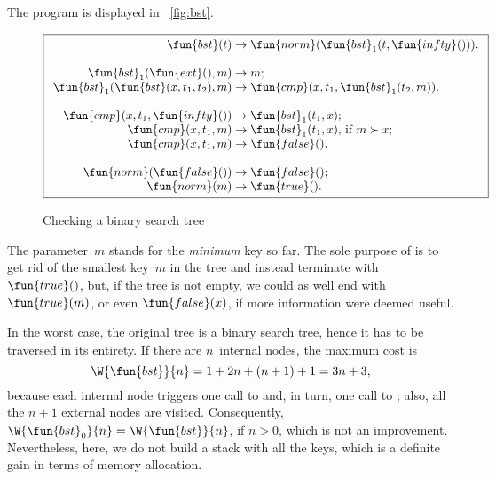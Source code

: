 The program is displayed in
\fig~\vref{fig:bst}.
\begin{figure}[t]
\begin{equation*}
\boxed{
\begin{array}{r@{\;}l@{\;}l}
  \fun{bst}(t) & \rightarrow & \fun{norm}(\fun{bst}_1(t,\fun{infty}())).\\
  \\
  \fun{bst}_1(\fun{ext}(),m) & \rightarrow & m;\\
  \fun{bst}_1(\fun{bst}(x,t_1,t_2),m) & \rightarrow &
  \fun{cmp}(x,t_1,\fun{bst}_1(t_2,m)).\\
\\
\fun{cmp}(x,t_1,\fun{infty}()) & \rightarrow & \fun{bst}_1(t_1,x);\\
\fun{cmp}(x,t_1,m) & \rightarrow &
  \fun{bst}_1(t_1,x), \,\text{if \(m \succ x\)};\\
\fun{cmp}(x,t_1,m) & \rightarrow & \fun{false}().\\
\\
\fun{norm}(\fun{false}()) & \rightarrow & \fun{false}();\\
\fun{norm}(m) & \rightarrow & \fun{true}().
\end{array}}
\end{equation*}
\caption{Checking a binary search tree}
\label{fig:bst}
\end{figure}
The parameter~\(m\) stands for the \emph{minimum} key so far. The sole
purpose of  is to get rid of the
smallest key~\(m\) in the tree and instead terminate with
\(\fun{true}()\), but, if the tree is not empty, we could as well end
with \(\fun{true}(m)\), or even \(\fun{false}(x)\), if more
information were deemed useful.

In the worst case, the original tree is a binary search tree, hence it
has to be traversed in its entirety. If there are \(n\)~internal
nodes, the maximum cost is
\begin{equation*}
  \W{\fun{bst}}{n} = 1 + 2n + (n+1) + 1 = 3n + 3,
  \index{bst@$\W{\fun{bst}}{n}$}
\end{equation*}
because each internal node triggers one call to
 and, in turn, one call
to ; also, all the \(n+1\) external
nodes are visited. Consequently, \(\W{\fun{bst}_0}{n} =
\W{\fun{bst}}{n}\), if \(n > 0\),
which is not an improvement. Nevertheless, here, we do not build a
stack with all the keys, which is a definite gain in terms of memory
allocation.

